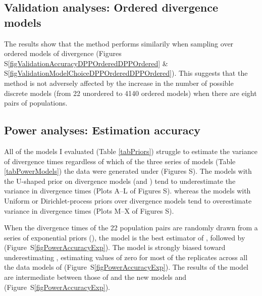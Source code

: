 \subsection{Validation analyses: Ordered divergence models}
The results show that the method performs similarily when sampling over ordered
models of divergence
(Figures S\ref{figValidationAccuracyDPPOrderedDPPOrdered} \&
S\ref{figValidationModelChoiceDPPOrderedDPPOrdered}).
This suggests that the method is not adversely affected by the increase
in the number of possible discrete models (from 22 unordered to 4140 ordered
models) when there are eight pairs of populations.

\subsection{Power analyses: Estimation accuracy}
All of the models I evaluated (Table \ref{tabPriors}) struggle to estimate the
variance of divergence times \divTimeDispersion regardless of which of the
three series of models (Table \ref{tabPowerModels}) the data were generated
under
(Figures
S).
The models with the U-shaped prior on divergence models (\modelOld and
\modelUshaped) tend to underestimate the variance in divergence times 
(Plots A--L of Figures
S).
whereas the models with Uniform or Dirichlet-process priors over divergence
models tend to overestimate variance in divergence times
(Plots M--X of Figures
S).

When the divergence times of the 22 population pairs are randomly drawn from a
series of exponential priors (\powerSeriesExp), the \modelDPP model is the
best estimator of \divTimeDispersion, followed by \modelUniform
(Figure~S\ref{figPowerAccuracyExp}).
The \modelOld model is strongly biased toward underestimating
\divTimeDispersion, estimating values of zero for most of the replicates across
all the data models of \powerSeriesExp (Figure~S\ref{figPowerAccuracyExp}).
The results of the \modelUshaped model are intermediate between those of
\modelOld and the new models \modelDPP and \modelUniform
(Figure~S\ref{figPowerAccuracyExp}).

